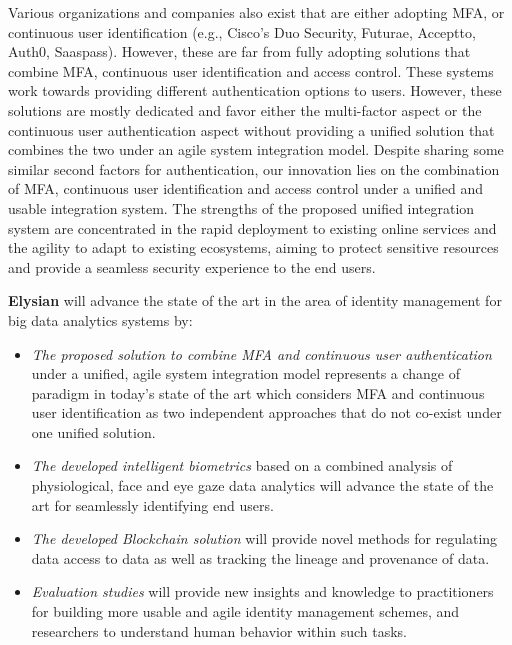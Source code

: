 \documentclass[a4paper,11pt]{article}
\newcommand{\project}[1]{\textbf{#1}\xspace}
\newcommand{\SECURITY}{\project{Elysian}}
\newcommand{\TheProject}{\SECURITY}
\begin{document}
Various organizations and companies also exist that are either adopting MFA, or continuous user identification (e.g., Cisco’s Duo Security, Futurae, Acceptto, Auth0, Saaspass). However, these are far from fully adopting solutions that combine MFA, continuous user identification and access control. These systems work towards providing different authentication options to users. However, these solutions are mostly dedicated and favor either the multi-factor aspect or the continuous user authentication aspect without providing a unified solution that combines the two under an agile system integration model. Despite sharing some similar second factors for authentication, our innovation lies on the combination of MFA, continuous user identification and access control under a unified and usable integration system. The strengths of the proposed unified integration system are concentrated in the rapid deployment to existing online services and the agility to adapt to existing ecosystems, aiming to protect sensitive resources and provide a seamless security experience to the end users.

\pagebreak

\begin{mdframed}[backgroundcolor=gray!10]
\TheProject{} will advance the state of the art in the area of identity management for big data analytics systems by:
\begin{itemize}
\item \emph{The proposed solution to combine MFA and continuous user authentication} under a unified, agile system integration model represents a change of paradigm in today’s state of the art which considers MFA and continuous user identification as two independent approaches that do not co-exist under one unified solution.
\item \emph{The developed intelligent biometrics} based on a combined analysis of physiological, face and eye gaze data analytics will advance the state of the art for seamlessly identifying end users.
\item \emph{The developed Blockchain solution} will provide novel methods for regulating data access to data as well as tracking the lineage and provenance of data. 
\item \emph{Evaluation studies} will provide new insights and knowledge to practitioners for building more usable and agile identity management schemes, and researchers to understand human behavior within such tasks.
\end{itemize}
\end{mdframed}
\end{document}
